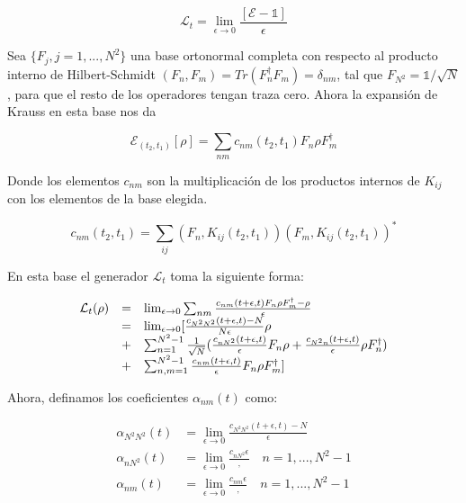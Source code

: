 \begin{equation}
    \mathcal{L}_t = \lim_{\epsilon \to 0} \frac{[\mathcal{E} - \mathds{1}]}{\epsilon}
\end{equation}

Sea $\{F_j, j = 1, ..., N^2\}$ una base ortonormal completa con respecto al producto interno de Hilbert-Schmidt $(F_n, F_m) = Tr(F_n^\dagger F_m) = \delta_{nm}$, tal que $F_{N^2} = \mathds{1}/\sqrt{N}$, para que el resto de los operadores tengan traza cero. Ahora la expansión de Krauss en esta base nos da

\begin{equation}
    \mathcal{E}_{(t_2, t_1)}[\rho] = \sum_{nm} c_{nm}(t_2, t_1) F_n \rho F_m^\dagger
\end{equation}

Donde los elementos $c_{nm}$ son la multiplicación de los productos internos de $K_{ij}$ con los elementos de la base elegida.

\begin{equation}
    c_{nm}(t_2, t_1) = \sum_{ij} (F_n, K_{ij}(t_2, t_1)) (F_m, K_{ij}(t_2, t_1))^*
\end{equation}

En esta base el generador $\mathcal{L}_t$ toma la siguiente forma:

\begin{equation}
    \begin{array}{r c l}
        \mathcal{L}_t(\rho)
        &=& \lim_{\epsilon \to 0} \sum_{nm} \frac{c_{nm}(t+\epsilon,t) F_n \rho F_m^\dagger - \rho}{\epsilon} \\
        &=& \lim_{\epsilon \to 0}
        [\frac{c_{N^2N^2}(t+\epsilon,t) - N}{N\epsilon} \rho \\
        &+& \sum_{n=1}^{N^2-1} \frac{1}{\sqrt{N}} (
        \frac{c_{nN^2}(t+\epsilon,t)}{\epsilon} F_n \rho +
        \frac{c_{N^2n}(t+\epsilon,t)}{\epsilon} \rho F_n^\dagger) \\
        &+& \sum_{n,m=1}^{N^2-1} \frac{c_{nm}(t+\epsilon,t)}{\epsilon} F_n \rho F_m^\dagger]
    \end{array}
\end{equation}

Ahora, definamos los coeficientes $\alpha_{nm}(t)$ como:

\begin{align}
    \alpha_{N^2N^2}(t) &= \lim_{\epsilon \to 0} \frac{c_{N^2N^2}(t+\epsilon,t) - N}{\epsilon} \\
    \alpha_{nN^2}(t) &= \lim_{\epsilon \to 0} \frac{c_{nN^2}{\epsilon}}, \quad n = 1, ... , N^2 -1 \\
    \alpha_{nm}(t) &= \lim_{\epsilon \to 0} \frac{c_{nm}{\epsilon}}, \quad n = 1, ... , N^2 -1
\end{align}

